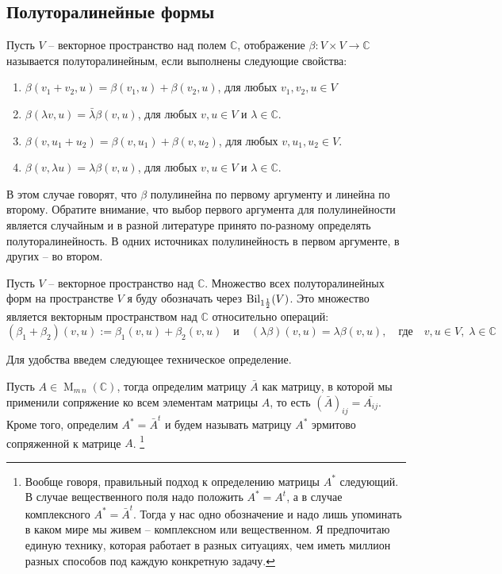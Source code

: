 \subsection{Полуторалинейные формы}

\begin{definition}
Пусть $V$ -- векторное пространство над полем $\mathbb C$, отображение $\beta \colon V\times V\to \mathbb C$ называется полуторалинейным, если выполнены следующие свойства:
\begin{enumerate}
\item $\beta(v_1+v_2, u) = \beta(v_1,u) + \beta(v_2, u)$, для любых $v_1, v_2, u\in V$

\item $\beta(\lambda v, u) = \bar \lambda \beta(v, u)$, для любых $v, u \in V$ и $\lambda\in \mathbb C$.

\item $\beta(v, u_1 + u_2) = \beta(v, u_1) + \beta(v, u_2)$, для любых $v, u_1, u_2\in V$.

\item $\beta(v, \lambda u) = \lambda\beta(v, u)$, для любых $v,u \in V$ и $\lambda \in \mathbb C$.
\end{enumerate}
\end{definition}

В этом случае говорят, что $\beta$ полулинейна по первому аргументу и линейна по второму.
Обратите внимание, что выбор первого аргумента для полулинейности является случайным и в разной литературе принято по-разному определять полуторалинейность.
В одних источниках полулинейность в первом аргументе, в других -- во втором.

\begin{definition}
Пусть $V$ -- векторное пространство над $\mathbb C$.
Множество всех полуторалинейных форм на пространстве $V$ я буду обозначать через $\operatorname{Bil}_{1\frac{1}{2}}(V)$.
Это множество является векторным пространством над $\mathbb C$ относительно операций:
\[
(\beta_1+\beta_2)(v, u) := \beta_1(v,u) + \beta_2(v,u)\quad\text{и}\quad (\lambda\beta)(v,u) = \lambda\beta(v,u),\quad\text{где}\quad v,u\in V,\;\lambda\in \mathbb C
\]
\end{definition}

Для удобства введем следующее техническое определение.
\begin{definition}
Пусть $A\in \operatorname{M}_{m\,n}(\mathbb C)$, тогда определим матрицу $\bar A$ как матрицу, в которой мы применили сопряжение ко всем элементам матрицы $A$, то есть $(\bar A)_{ij} = \overline{A_{ij}}$.
Кроме того, определим $A^* = \bar A^t$ и будем называть матрицу $A^*$ эрмитово сопряженной к матрице $A$.%
\footnote{Вообще говоря, правильный подход к определению матрицы $A^*$ следующий.
В случае вещественного поля надо положить $A^* = A^t$, а в случае комплексного $A^* = \bar A^t$.
Тогда у нас одно обозначение и надо лишь упоминать в каком мире мы живем -- комплексном или вещественном.
Я предпочитаю единую технику, которая работает в разных ситуациях, чем иметь миллион разных способов под каждую конкретную задачу.}
\end{definition}

